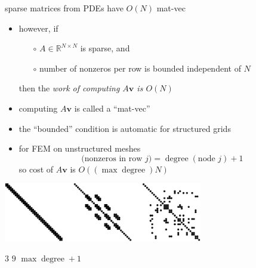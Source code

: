 \documentclass[hide notes,intlimits,usenames,dvipsnames]{beamer}
\newcommand{\RR}{\mathbb{R}}
\newcommand{\bv}{\mathbf{v}}
\begin{document}
\begin{frame}{sparse matrices from PDEs have $O(N)$ mat-vec}

\begin{itemize}
\item however, if
    \begin{itemize}
    \item[$\circ$] $A \in \RR^{N\times N}$ is sparse, and
    \item[$\circ$] number of nonzeros per row is bounded independent of $N$
    \end{itemize}
then the \emph{work of computing $A \bv$ is $O(N)$}
\item computing $A \bv$ is called a ``mat-vec''
\item the ``bounded'' condition is automatic for structured grids
\item for FEM on unstructured meshes
   $$\text{(nonzeros in row } j) = \operatorname{degree}(\text{node } j) + 1$$
so cost of $A\bv$ is $O((\max \operatorname{degree}) N)$
\end{itemize}

\smallskip
\begin{center}
\includegraphics[width=0.65\textwidth]{figs/spythree}

\tiny

\qquad $3$ \qquad\qquad\qquad\qquad\qquad\qquad $9$ \quad\qquad\qquad\qquad\quad $\max \operatorname{degree} + 1$
\end{center}
\end{frame}
\end{document}
